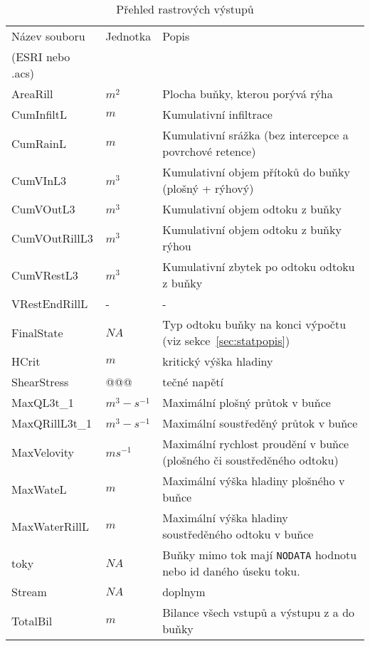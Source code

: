 \begin{table}[h!]
 

 \centering
 \caption{Přehled rastrových výstupů}
\label{tab:vystupyrast}

 \begin{tabular}{llp{}}
 \hline
 Název souboru    & Jednotka    & Popis       \\ 
 (ESRI nebo .acs)    &     &        \\ \hline \hline
 AreaRill       &   $m^2$      &  Plocha buňky, kterou porývá rýha \\
 CumInfiltL     &   $m$        & Kumulativní infiltrace \\
 CumRainL       &  $m$  &  Kumulativní srážka (bez intercepce a povrchové retence) \\
 CumVInL3       &  $m^3$  & Kumulativní objem přítoků do buňky  (plošný + rýhový) \\
 CumVOutL3       &  $m^3$  & Kumulativní objem odtoku z buňky \\
 CumVOutRillL3       &  $m^3$  & Kumulativní objem odtoku z buňky rýhou \\
 CumVRestL3      &  $m^3$  & Kumulativní zbytek po odtoku odtoku z buňky\\
 VRestEndRillL   &  - &  - \\
 FinalState    &  $NA$ & Typ odtoku buňky na konci výpočtu (viz sekce~\ref{sec:statpopis})\\
 HCrit            & $m$    &  kritický výška hladiny \\
 ShearStress   &   @@@ &  tečné napětí \\
 MaxQL3t\_1	  &   $m^3-s^{-1}$	&  Maximální plošný průtok v buňce  \\
 MaxQRillL3t\_1    &   $m^3-s^{-1}$	&  Maximální soustředěný průtok v buňce\\
 MaxVelovity	&   $ms^{-1}$	&  Maximální rychlost proudění v buňce (plošného či soustředěného odtoku) \\
 MaxWateL    &   $m$  &   Maximální výška hladiny plošného v buňce \\
 MaxWaterRillL   &   $m$  &   Maximální výška hladiny soustředěného odtoku v buňce \\
 toky   &  $NA$ &  Buňky mimo tok mají {\tt NODATA} hodnotu nebo id daného úseku toku.  \\
 Stream   &  $NA$ & doplnym  \\
 TotalBil   &   $m$  &  Bilance všech vstupů a výstupu z a do buňky  \\
 \end{tabular}

\end{table}



